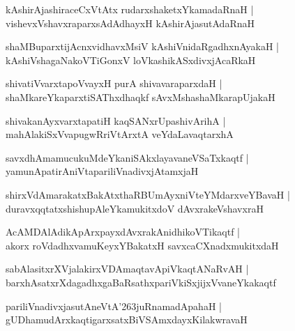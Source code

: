 \documentclass[twoside,12pt,openright]{book}
\def\S{\char'263}
\newcounter{shloka}[chapter]
\begin{document}
\begin{shloka}%
kAshirAjashiraceCxVtAtx rudarxshaketxYkamadaRnaH |\\
vishevxVshavxraparxsAdAdhayxH kAshirAjasutAdaRnaH
\end{shloka}

\begin{shloka}%
shaMBuparxtijAcnxvidhavxMsiV kAshiVnidaRgadhxnAyakaH |\\
kAshiVshagaNakoVTiGonxV loVkashikASxdivxjAcaRkaH 
\end{shloka}

\begin{shloka}%
shivatiVvarxtapoVvayxH purA shivavaraparxdaH |\\
shaMkareYkaparxtiSAThxdhaqkf sAvxMshashaMkarapUjakaH 
\end{shloka}

\begin{shloka}%
shivakanAyxvarxtapatiH kaqSANxrUpashivArihA |\\
mahAlakiSxVvapugwRriVtArxtA veYdaLavaqtarxhA 
\end{shloka}

\begin{shloka}%
savxdhAmamucukuMdeYkaniSAkxlayavaneVSaTxkaqtf |\\
yamunApatirAniVtapariliVnadivxjAtamxjaH 
\end{shloka}

\begin{shloka}%
shirxVdAmarakatxBakAtxthaRBUmAyxniVteYMdarxveYBavaH |\\
duravxqqtatxshishupAleYkamukitxdoV dAvxrakeVshavxraH
\end{shloka}

\begin{shloka}%
AcAMDAlAdikApArxpayxdAvxrakAnidhikoVTikaqtf |\\
akorx roVdadhxvamuKeyxYBakatxH savxcaCXnadxmukitxdaH 
\end{shloka}

\begin{shloka}%
sabAlasitxrXVjalakirxVDAmaqtavApiVkaqtANaRvAH |\\
barxhAsatxrXdagadhxgaBaRsathxpariVkiSxjijxVvaneYkakaqtf
\end{shloka}

\begin{shloka}%
pariliVnadivxjasutAneVtA\S juRnamadApahaH |\\
gUDhamudArxkaqtigarxsatxBiVSAmxdayxKilakwravaH 
\end{shloka}
\end{document}

